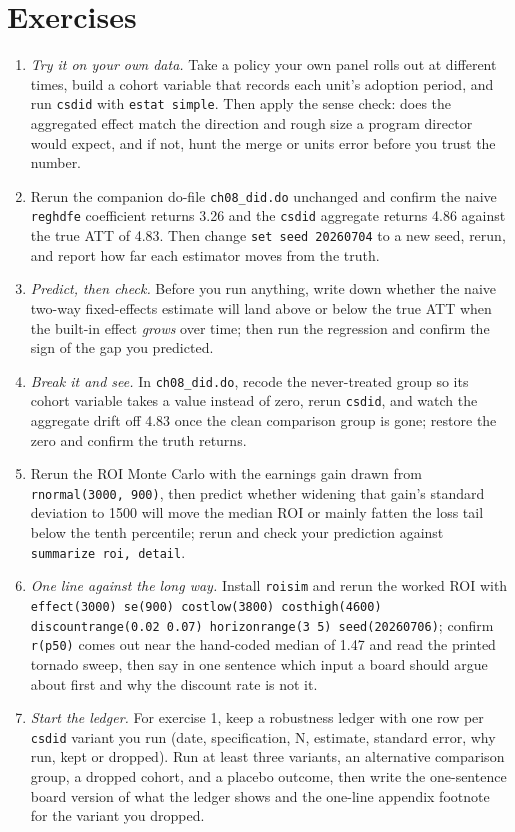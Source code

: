 \section*{Exercises}
\begin{enumerate}
  \item \emph{Try it on your own data.} Take a policy your own panel rolls out at different times, build a cohort variable that records each unit's adoption period, and run \texttt{csdid} with \texttt{estat simple}. Then apply the sense check: does the aggregated effect match the direction and rough size a program director would expect, and if not, hunt the merge or units error before you trust the number.
  \item Rerun the companion do-file \texttt{ch08\_did.do} unchanged and confirm the naive \texttt{reghdfe} coefficient returns 3.26 and the \texttt{csdid} aggregate returns 4.86 against the true ATT of 4.83. Then change \texttt{set seed 20260704} to a new seed, rerun, and report how far each estimator moves from the truth.
  \item \emph{Predict, then check.} Before you run anything, write down whether the naive two-way fixed-effects estimate will land above or below the true ATT when the built-in effect \emph{grows} over time; then run the regression and confirm the sign of the gap you predicted.
  \item \emph{Break it and see.} In \texttt{ch08\_did.do}, recode the never-treated group so its cohort variable takes a value instead of zero, rerun \texttt{csdid}, and watch the aggregate drift off 4.83 once the clean comparison group is gone; restore the zero and confirm the truth returns.
  \item Rerun the ROI Monte Carlo with the earnings gain drawn from \texttt{rnormal(3000, 900)}, then predict whether widening that gain's standard deviation to 1500 will move the median ROI or mainly fatten the loss tail below the tenth percentile; rerun and check your prediction against \texttt{summarize roi, detail}.
  \item \emph{One line against the long way.} Install \texttt{roisim} and rerun the worked ROI with \texttt{effect(3000) se(900) costlow(3800) costhigh(4600) discountrange(0.02 0.07) horizonrange(3 5) seed(20260706)}; confirm \texttt{r(p50)} comes out near the hand-coded median of 1.47 and read the printed tornado sweep, then say in one sentence which input a board should argue about first and why the discount rate is not it.
  \item \emph{Start the ledger.} For exercise 1, keep a robustness ledger with one row per \texttt{csdid} variant you run (date, specification, N, estimate, standard error, why run, kept or dropped). Run at least three variants, an alternative comparison group, a dropped cohort, and a placebo outcome, then write the one-sentence board version of what the ledger shows and the one-line appendix footnote for the variant you dropped.
\end{enumerate}
